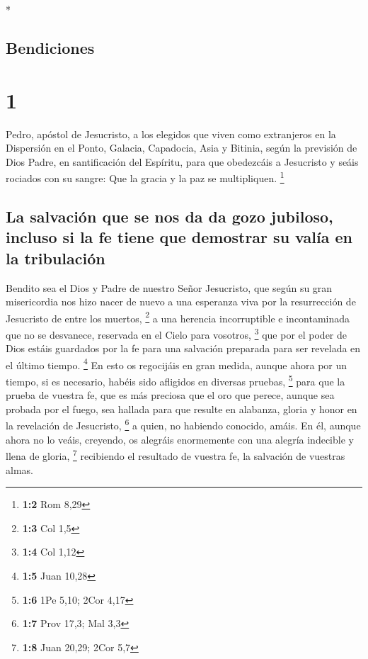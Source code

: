 \begin{paracol}{2} \switchcolumn[0]*

\hypertarget{bendiciones}{%
\subsection{Bendiciones}\label{bendiciones}}

\hypertarget{section}{%
\section{1}\label{section}}

 Pedro, apóstol de Jesucristo, a los elegidos que viven
como extranjeros en la Dispersión en el Ponto, Galacia, Capadocia, Asia
y Bitinia,  según la previsión de Dios Padre, en
santificación del Espíritu, para que obedezcáis a Jesucristo y seáis
rociados con su sangre: Que la gracia y la paz se multipliquen.
\footnote{\textbf{1:2} Rom 8,29}

\hypertarget{la-salvaciuxf3n-que-se-nos-da-da-gozo-jubiloso-incluso-si-la-fe-tiene-que-demostrar-su-valuxeda-en-la-tribulaciuxf3n}{%
\subsection{La salvación que se nos da da gozo jubiloso, incluso si la
fe tiene que demostrar su valía en la
tribulación}\label{la-salvaciuxf3n-que-se-nos-da-da-gozo-jubiloso-incluso-si-la-fe-tiene-que-demostrar-su-valuxeda-en-la-tribulaciuxf3n}}

 Bendito sea el Dios y Padre de nuestro Señor Jesucristo,
que según su gran misericordia nos hizo nacer de nuevo a una esperanza
viva por la resurrección de Jesucristo de entre los muertos, \footnote{\textbf{1:3}
  Col 1,5}  a una herencia incorruptible e incontaminada
que no se desvanece, reservada en el Cielo para vosotros, \footnote{\textbf{1:4}
  Col 1,12}  que por el poder de Dios estáis guardados por
la fe para una salvación preparada para ser revelada en el último
tiempo. \footnote{\textbf{1:5} Juan 10,28}  En esto os
regocijáis en gran medida, aunque ahora por un tiempo, si es necesario,
habéis sido afligidos en diversas pruebas, \footnote{\textbf{1:6} 1Pe
  5,10; 2Cor 4,17}  para que la prueba de vuestra fe, que
es más preciosa que el oro que perece, aunque sea probada por el fuego,
sea hallada para que resulte en alabanza, gloria y honor en la
revelación de Jesucristo, \footnote{\textbf{1:7} Prov 17,3; Mal 3,3}
 a quien, no habiendo conocido, amáis. En él, aunque ahora
no lo veáis, creyendo, os alegráis enormemente con una alegría indecible
y llena de gloria, \footnote{\textbf{1:8} Juan 20,29; 2Cor 5,7}
 recibiendo el resultado de vuestra fe, la salvación de
vuestras almas.


\end{paracol}
